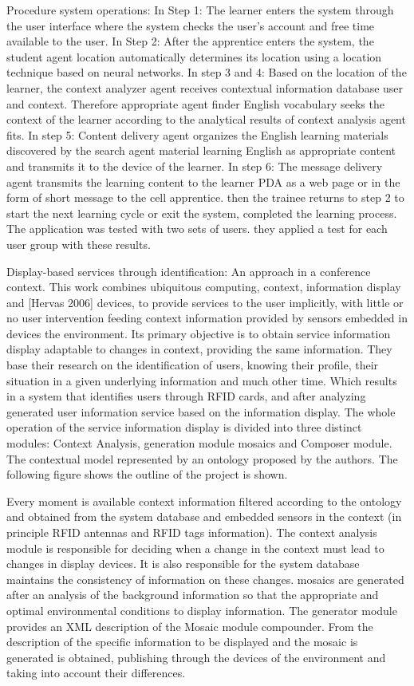 Procedure system operations:
In Step 1: The learner enters the system through the user interface where the system checks the user's account and free time available to the user.
In Step 2: After the apprentice enters the system, the student agent location automatically determines its location using a location technique based on neural networks.
In step 3 and 4: Based on the location of the learner, the context analyzer agent receives contextual information database user and context. Therefore appropriate agent finder English vocabulary seeks the context of the learner according to the analytical results of context analysis agent fits.
In step 5: Content delivery agent organizes the English learning materials discovered by the search agent material learning English as appropriate content and transmits it to the device of the learner.
In step 6: The message delivery agent transmits the learning content to the learner PDA as a web page or in the form of short message to the cell apprentice. then the trainee returns to step 2 to start the next learning cycle or exit the system, completed the learning process.
The application was tested with two sets of users. they applied a test for each user group with these results.
 
	
Display-based services through identification: An approach in a conference context.
This work combines ubiquitous computing, context, information display and [Hervas 2006] devices, to provide services to the user implicitly, with little or no user intervention feeding context information provided by sensors embedded in devices the environment. Its primary objective is to obtain service information display adaptable to changes in context, providing the same information. They base their research on the identification of users, knowing their profile, their situation in a given underlying information and much other time. Which results in a system that identifies users through RFID cards, and after analyzing generated user information service based on the information display. The whole operation of the service information display is divided into three distinct modules: Context Analysis, generation module mosaics and Composer module. The contextual model represented by an ontology proposed by the authors. The following figure shows the outline of the project is shown.
 
Every moment is available context information filtered according to the ontology and obtained from the system database and embedded sensors in the context (in principle RFID antennas and RFID tags information). The context analysis module is responsible for deciding when a change in the context must lead to changes in display devices. It is also responsible for the system database maintains the consistency of information on these changes. mosaics are generated after an analysis of the background information so that the appropriate and optimal environmental conditions to display information. The generator module provides an XML description of the Mosaic module compounder. From the description of the specific information to be displayed and the mosaic is generated is obtained, publishing through the devices of the environment and taking into account their differences.

 
